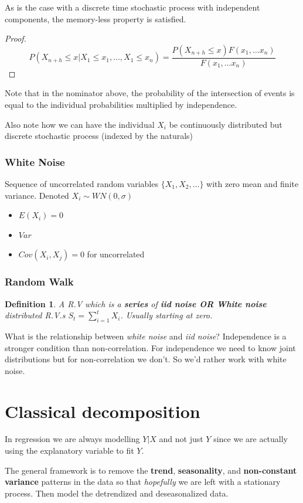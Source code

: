 \documentclass{article}
\newtheorem{definition}{Definition}
\begin{document}
As is the case with a discrete time stochastic process with independent components, the memory-less property is satisfied.  
\begin{proof}
\[ P(X_{n+h} \leq x | X_1 \leq x_1, \dots, X_1 \leq x_n ) = \frac{P(X_{n+h} \leq x)  F(x_1, \dots x_n)}{F(x_1, \dots x_n)}\]
\end{proof}
Note that in the nominator above, the probability of the intersection of events is equal to the individual probabilities multiplied by independence. 

Also note how we can have the individual $X_i$ be continuously distributed but discrete stochastic process (indexed by the naturals)

\subsubsection{White Noise }
Sequence of uncorrelated random variables $\{X_1, X_2, \dots \}$ with zero mean and finite variance. Denoted $X_i \sim WN(0, \sigma)$
\begin{itemize}
\item $E(X_i)=0$ 
\item $Var$
\item $Cov(X_i, X_j) = 0$ for uncorrelated 
\end{itemize}


\subsubsection{Random Walk}
\begin{definition}
A R.V which is a \textbf{series} of \textbf{iid noise OR White noise} distributed R.V.s $S_t = \sum_{i=1}^t X_i$. Usually starting at zero. 
\end{definition}

What is the relationship between \textit{white noise} and \textit{iid noise}?
Independence is a stronger condition than non-correlation. For independence we need to know joint distributions but for non-correlation we don't. So we'd rather work with white noise. 

\section{Classical decomposition}
In regression we are always modelling $Y|X$ and not just $Y$ since we are actually using the explanatory variable to fit $Y$.

The general framework is to remove the \textbf{trend}, \textbf{seasonality}, and \textbf{non-constant variance} patterns in the data  so that \textit{hopefully} we are left with a stationary process. Then model the detrendized and deseasonalized data. 
\end{document}
